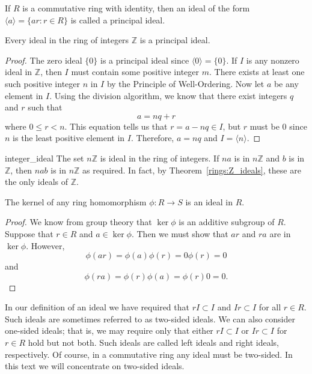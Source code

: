  

 
 
If $R$ is a commutative ring with identity, then an ideal of the form
$\langle a \rangle  = \{ ar : r \in R \}$  is called a {\bfi principal
ideal}.  
 
 
\begin{theorem}\label{rings:Z_ideals}
Every ideal in the ring of integers ${\mathbb Z}$ is a principal ideal.
\end{theorem}
 
 
\begin{proof}
The zero ideal $\{ 0 \}$ is a principal ideal since $\langle 0
\rangle = \{ 0 \}$. If  $I$ is any nonzero ideal in ${\mathbb Z}$, then 
$I$ must contain some positive integer $m$.  There exists at least one
such positive integer $n$ in $I$ by the Principle of Well-Ordering. 
Now let $a$ be any element in $I$. Using the division algorithm, we 
know that there exist integers $q$ and $r$ such that 
\[
a = nq + r
\]
where $0 \leq r < n$. This equation tells us that $r = a - nq \in I$,
but $r$ must be $0$ since $n$ is the least positive element in $I$.
Therefore, $a = nq$ and $I = \langle n \rangle$.
\mbox{\hspace*{1in}}
\end{proof}
 
 
\begin{example}{integer_ideal}
The set $n {\mathbb Z}$ is ideal in the ring of integers. If $na$ is in
$n{\mathbb Z}$ and $b$ is in ${\mathbb Z}$, then $nab$ is in  $n {\mathbb Z}$
as required. In fact, by Theorem~\ref{rings:Z_ideals}, these are the only
ideals of ${\mathbb Z}$.
\end{example}
 
 
\begin{proposition}
The kernel of any ring homomorphism $\phi : R \rightarrow S$ is an
ideal in $R$. 
\end{proposition}
 
 
\begin{proof}
We know from group theory that $\ker \phi$ is an additive subgroup of
$R$. Suppose that $r \in R$ and $a \in \ker \phi$. Then we must show
that $ar$ and $ra$ are in $\ker \phi$. However, 
\[
\phi(ar) = \phi(a) \phi(r) = 0 \phi(r) = 0
\]
and 
\[
\phi(ra) = \phi(r) \phi(a) =  \phi(r)0 = 0.
\]
\end{proof}
 
 
\medskip
 
 
In our definition of an ideal we have required that $rI \subset I$ and
$Ir \subset I$ for all $r \in R$.  Such ideals are sometimes referred
to as {\bfi two-sided ideals}.  We can also
consider {\bfi one-sided ideals}; that is,  we
may require only that either $rI \subset I$ or $Ir \subset I$ for $r
\in R$ hold but not both. Such ideals are called {\bfi left ideals\/}
and {\bfi right ideals}, respectively. Of course, in a commutative
ring any ideal must be two-sided. In this text we will concentrate on
two-sided ideals.
 

